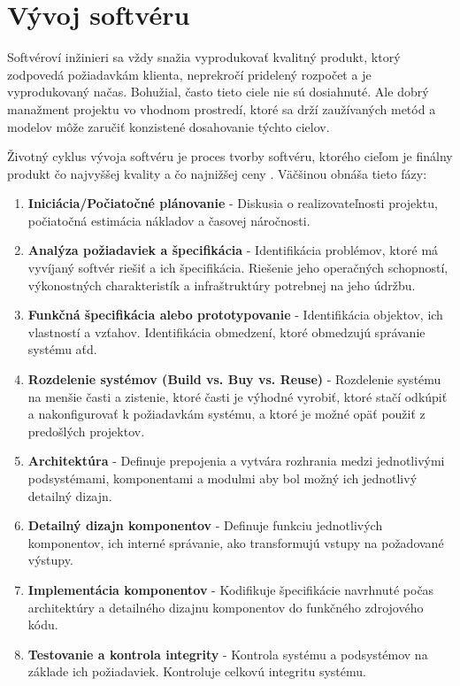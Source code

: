 \documentclass[10pt,twoside,slovak,a4paper]{article}
\begin{document}
\section{Vývoj softvéru} \label{vyvojSoftveru}

Softvéroví inžinieri sa vždy snažia vyprodukovať kvalitný produkt, ktorý zodpovedá požiadavkám klienta, neprekročí pridelený rozpočet a je vyprodukovaný načas. Bohužial, často tieto ciele nie sú dosiahnuté. Ale dobrý manažment projektu vo vhodnom prostredí, ktoré sa drží zaužívaných metód a modelov môže zaručiť konzistené dosahovanie týchto cielov. \cite{Methodologies}

Životný cyklus vývoja softvéru je proces tvorby softvéru, ktorého cieľom je finálny produkt čo najvyššej kvality a čo najnižšej ceny \cite{SDLCdef}. Väčšinou obnáša tieto fázy:\cite{SDCLphases}
\begin{sloppypar}
\begin{enumerate}
\item \textbf{Iniciácia/Počiatočné plánovanie} - Diskusia o realizovateľnosti projektu, počiatočná estimácia nákladov a časovej náročnosti.
\item \textbf{Analýza požiadaviek a špecifikácia} - Identifikácia problémov, ktoré má vyvíjaný softvér riešiť a ich špecifikácia. Riešenie jeho operačných schopností, výkonostných charakteristík a infraštruktúry potrebnej na jeho údržbu.
\item \textbf{Funkčná špecifikácia alebo prototypovanie} - Identifikácia objektov, ich vlastností a vzťahov. Identifikácia obmedzení, ktoré obmedzujú správanie systému aťd. 
\item \textbf{Rozdelenie systémov (Build vs. Buy vs. Reuse)} - Rozdelenie systému na menšie časti a zistenie, ktoré časti je výhodné vyrobiť, ktoré stačí odkúpiť a nakonfigurovať k požiadavkám systému, a ktoré je možné opäť použiť z predošlých projektov.
\item \textbf{Architektúra} - Definuje prepojenia a vytvára rozhrania medzi jednotlivými podsystémami, komponentami a modulmi aby bol možný ich jednotlivý detailný dizajn.
\item \textbf{Detailný dizajn komponentov} - Definuje funkciu jednotlivých komponentov, ich interné správanie, ako transformujú vstupy na požadované výstupy.
\item \textbf{Implementácia komponentov} - Kodifikuje špecifikácie navrhnuté počas architektúry a detailného dizajnu komponentov do funkčného zdrojového kódu.
\item \textbf{Testovanie a kontrola integrity} - Kontrola systému a podsystémov na základe ich požiadaviek. Kontroluje celkovú integritu systému.

\end{enumerate}
\end{sloppypar}
\end{document}
